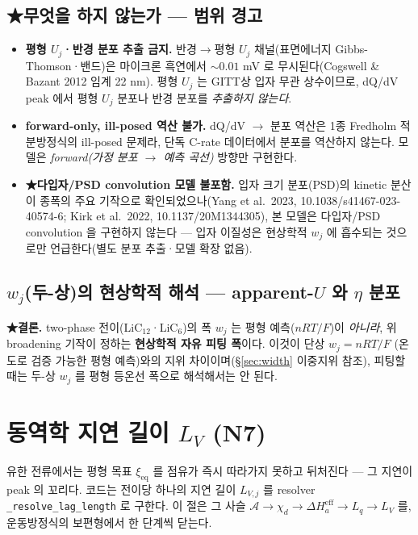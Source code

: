 \documentclass[11pt,a4paper]{article}
\newcommand{\eff}{\mathrm{eff}}
\newcommand{\eq}{\mathrm{eq}}
\newcommand{\code}[1]{\texttt{#1}}
\begin{document}
\subsection{★무엇을 하지 않는가 — 범위 경고}\label{sec:broadening-scope}
\begin{itemize}[leftmargin=1.4em,itemsep=3pt]
\item \textbf{평형 $U_j$·반경 분포 추출 금지.} 반경$\to$평형 $U_j$ 채널(표면에너지 Gibbs-Thomson·밴드)은
  마이크론 흑연에서 $\sim0.01$ mV 로 무시된다(Cogswell \& Bazant 2012 임계 22 nm). 평형 $U_j$ 는
  GITT상 입자 무관 상수이므로, dQ/dV peak 에서 평형 $U_j$ 분포나 반경 분포를 \emph{추출하지 않는다}.
\item \textbf{forward-only, ill-posed 역산 불가.} dQ/dV $\to$ 분포 역산은 1종 Fredholm 적분방정식의
  ill-posed 문제라, 단독 C-rate 데이터에서 분포를 역산하지 않는다. 모델은
  \emph{forward(가정 분포 $\to$ 예측 곡선)} 방향만 구현한다.
\item \textbf{★다입자/PSD convolution 모델 불포함.} 입자 크기 분포(PSD)의 kinetic 분산이 종폭의
  주요 기작으로 확인되었으나(Yang et al.\ 2023, 10.1038/s41467-023-40574-6; Kirk et al.\ 2022,
  10.1137/20M1344305), 본 모델은 다입자/PSD convolution 을 구현하지 않는다 — 입자 이질성은
  현상학적 $w_j$ 에 흡수되는 것으로만 언급한다(별도 분포 추출·모델 확장 없음).
\end{itemize}

\subsection{$w_j$(두-상)의 현상학적 해석 — apparent-$U$ 와 $\eta$ 분포}\label{sec:broadening-wj}
\textbf{★결론.} two-phase 전이(LiC$_{12}$·LiC$_6$)의 폭 $w_j$ 는 평형 예측($nRT/F$)이 \emph{아니라},
위 broadening 기작이 정하는 \textbf{현상학적 자유 피팅 폭}이다. 이것이 단상 $w_j=nRT/F$ (온도로
검증 가능한 평형 예측)와의 지위 차이이며(\S\ref{sec:width} 이중지위 참조), 피팅할 때는 두-상 $w_j$ 를
평형 등온선 폭으로 해석해서는 안 된다.

\section{동역학 지연 길이 $L_V$ (N7)}\label{sec:lag}
유한 전류에서는 평형 목표 $\xi_\eq$ 를 점유가 즉시 따라가지 못하고 뒤처진다 — 그 지연이 peak 의 꼬리다. 코드는 전이당
하나의 지연 길이 $L_{V,j}$ 를 resolver \code{\_resolve\_lag\_length} 로 구한다. 이 절은 그 사슬
$\mathcal A\to\chi_d\to\Delta H_a^\eff\to L_q\to L_V$ 를, 운동방정식의 보편형에서 한 단계씩 닫는다.
\end{document}
